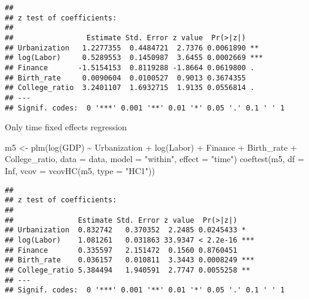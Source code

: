 \documentclass[
]{article}
\newenvironment{Shaded}{\begin{snugshade}}{\end{snugshade}}
\newcommand{\AttributeTok}[1]{\textcolor[rgb]{0.77,0.63,0.00}{#1}}
\newcommand{\ConstantTok}[1]{\textcolor[rgb]{0.00,0.00,0.00}{#1}}
\newcommand{\FunctionTok}[1]{\textcolor[rgb]{0.00,0.00,0.00}{#1}}
\newcommand{\NormalTok}[1]{#1}
\newcommand{\OtherTok}[1]{\textcolor[rgb]{0.56,0.35,0.01}{#1}}
\newcommand{\SpecialCharTok}[1]{\textcolor[rgb]{0.00,0.00,0.00}{#1}}
\newcommand{\StringTok}[1]{\textcolor[rgb]{0.31,0.60,0.02}{#1}}
\begin{document}
\begin{verbatim}
## 
## z test of coefficients:
## 
##                 Estimate Std. Error z value  Pr(>|z|)    
## Urbanization   1.2277355  0.4484721  2.7376 0.0061890 ** 
## log(Labor)     0.5289553  0.1450987  3.6455 0.0002669 ***
## Finance       -1.5154153  0.8119288 -1.8664 0.0619800 .  
## Birth_rate     0.0090604  0.0100527  0.9013 0.3674355    
## College_ratio  3.2401107  1.6932715  1.9135 0.0556814 .  
## ---
## Signif. codes:  0 '***' 0.001 '**' 0.01 '*' 0.05 '.' 0.1 ' ' 1
\end{verbatim}

\newpage

Only time fixed effects regression

\begin{Shaded}
\begin{Highlighting}[]
\NormalTok{m5 }\OtherTok{\textless{}{-}} \FunctionTok{plm}\NormalTok{(}\FunctionTok{log}\NormalTok{(GDP) }\SpecialCharTok{\textasciitilde{}}\NormalTok{ Urbanization }\SpecialCharTok{+} \FunctionTok{log}\NormalTok{(Labor) }\SpecialCharTok{+}\NormalTok{ Finance }\SpecialCharTok{+}\NormalTok{ Birth\_rate }\SpecialCharTok{+}\NormalTok{ College\_ratio, }
          \AttributeTok{data =}\NormalTok{ data, }\AttributeTok{model =} \StringTok{"within"}\NormalTok{, }\AttributeTok{effect =} \StringTok{"time"}\NormalTok{)}
\FunctionTok{coeftest}\NormalTok{(m5, }\AttributeTok{df =} \ConstantTok{Inf}\NormalTok{, }\AttributeTok{vcov =} \FunctionTok{vcovHC}\NormalTok{(m5, }\AttributeTok{type =} \StringTok{"HC1"}\NormalTok{))}
\end{Highlighting}
\end{Shaded}

\begin{verbatim}
## 
## z test of coefficients:
## 
##               Estimate Std. Error z value  Pr(>|z|)    
## Urbanization  0.832742   0.370352  2.2485 0.0245433 *  
## log(Labor)    1.081261   0.031863 33.9347 < 2.2e-16 ***
## Finance       0.335597   2.151472  0.1560 0.8760451    
## Birth_rate    0.036157   0.010811  3.3443 0.0008249 ***
## College_ratio 5.384494   1.940591  2.7747 0.0055258 ** 
## ---
## Signif. codes:  0 '***' 0.001 '**' 0.01 '*' 0.05 '.' 0.1 ' ' 1
\end{verbatim}
\end{document}
